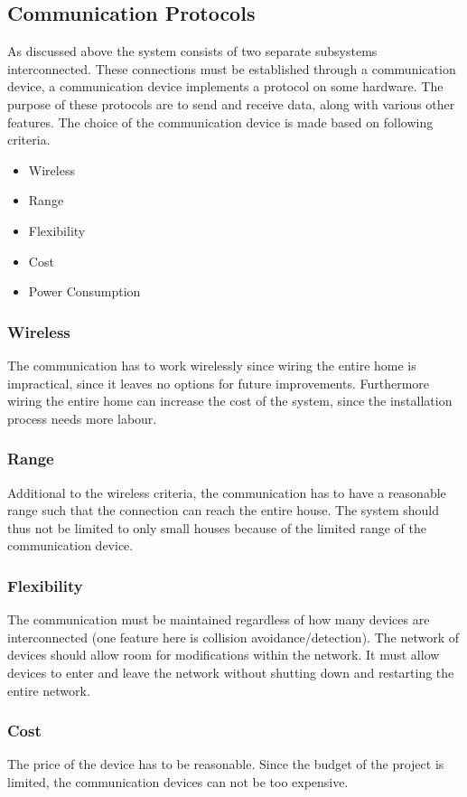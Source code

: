 \subsection{Communication Protocols}
\label{sub:Communicationprotocols}
As discussed above the system consists of two separate subsystems interconnected. These connections must be established through a communication device, a communication device implements a protocol on some hardware. The purpose of these protocols are to send and receive data, along with various other features. The choice of the communication device is made based on following criteria.
\begin{itemize}
  \item Wireless
  \item Range
  \item Flexibility
  \item Cost
  \item Power Consumption
\end{itemize}

\subsubsection{Wireless}
The communication has to work wirelessly since wiring the entire home is impractical, since it leaves no options for future improvements. Furthermore wiring the entire home can increase the cost of the system, since the installation process needs more labour.

\subsubsection{Range}
Additional to the wireless criteria, the communication has to have a reasonable range such that the connection can reach the entire house. The system should thus not be limited to only small houses because of the limited range of the communication device.

\subsubsection{Flexibility}
The communication must be maintained regardless of how many devices are interconnected (one feature here is collision avoidance/detection). The network of devices should allow room for modifications within the network. It must allow devices to enter and leave the network without shutting down and restarting the entire network.

\subsubsection{Cost}
The price of the device has to be reasonable. Since the budget of the project is limited, the communication devices can not be too expensive.

